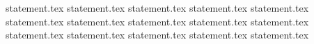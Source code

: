 {statement.tex}
{statement.tex}
{statement.tex}
{statement.tex}
{statement.tex}
{statement.tex}
{statement.tex}
{statement.tex}
{statement.tex}
{statement.tex}
{statement.tex}
{statement.tex}
{statement.tex}
{statement.tex}
{statement.tex}
